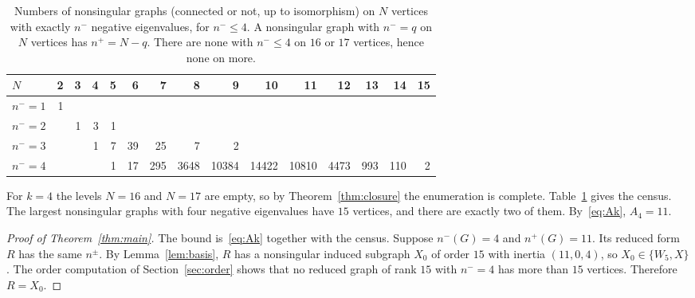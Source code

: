 \documentclass[11pt]{amsart}
\theoremstyle{definition}
\theoremstyle{remark}
\begin{document}
\begin{table}[ht]
\centering
\begin{tabular}{@{}lrrrrrrrrrrrrrr@{}}
\toprule
$N$ & 2&3&4&5&6&7&8&9&10&11&12&13&14&15\\
\midrule
$n^-=1$ & 1&&&&&&&&&&&&&\\
$n^-=2$ & &1&3&1&&&&&&&&&&\\
$n^-=3$ & &&1&7&39&25&7&2&&&&&&\\
$n^-=4$ & &&&1&17&295&3648&10384&14422&10810&4473&993&110&2\\
\bottomrule
\end{tabular}
\caption{Numbers of nonsingular graphs (connected or not, up to isomorphism) on $N$ vertices with exactly $n^-$ negative eigenvalues, for $n^-\le4$. A nonsingular graph with $n^-=q$ on $N$ vertices has $n^+=N-q$. There are none with $n^-\le4$ on $16$ or $17$ vertices, hence none on more.}
\label{tab:census}
\end{table}

For $k=4$ the levels $N=16$ and $N=17$ are empty, so by Theorem~\ref{thm:closure} the enumeration is complete. Table~\ref{tab:census} gives the census. The largest nonsingular graphs with four negative eigenvalues have $15$ vertices, and there are exactly two of them. By~\eqref{eq:Ak}, $A_4=11$.

\begin{proof}[Proof of Theorem~\ref{thm:main}]
The bound is~\eqref{eq:Ak} together with the census. Suppose $n^-(G)=4$ and $n^+(G)=11$. Its reduced form $R$ has the same $n^\pm$. By Lemma~\ref{lem:basis}, $R$ has a nonsingular induced subgraph $X_0$ of order $15$ with inertia $(11,0,4)$, so $X_0\in\{W_5,X\}$. The order computation of Section~\ref{sec:order} shows that no reduced graph of rank $15$ with $n^-=4$ has more than $15$ vertices. Therefore $R=X_0$.
\end{proof}
\end{document}
